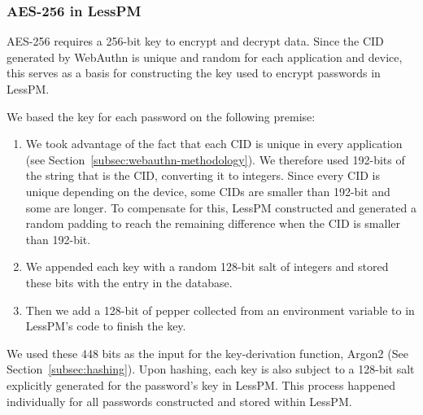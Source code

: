 \subsubsection{AES-256 in LessPM}
AES-256 requires a 256-bit key to encrypt and decrypt data.
Since the CID generated by WebAuthn is unique and random for each application
and device, this serves as a basis for constructing the key used to encrypt
passwords in LessPM\@.

We based the key for each password on the following premise:
\begin{enumerate}
  \item
  We took advantage of the fact that each CID is unique in every application
  (see Section~\ref{subsec:webauthn-methodology}).
  We therefore used 192-bits of the string that is the CID\@, converting it to
  integers.
  Since every CID is unique depending on the device, some CIDs are smaller
  than 192-bit and some are longer.
  To compensate for this, LessPM constructed and generated a random padding
  to reach the remaining difference when the CID is smaller than 192-bit.
  \item
  We appended each key with a random 128-bit salt of integers and stored these
  bits with the entry in the database.
  \item
  Then we add a 128-bit of pepper collected from an environment variable to
  in LessPM's code to finish the key.
\end{enumerate}
We used these 448 bits as the input for the key-derivation function,
Argon2 (See Section~\ref{subsec:hashing}).
Upon hashing, each key is also subject to a 128-bit salt explicitly generated
for the password's key in LessPM\@.
This process happened individually for all passwords constructed and stored
within LessPM\@.